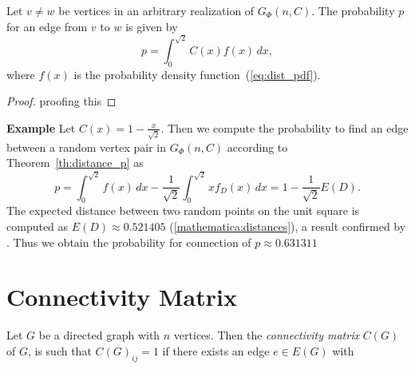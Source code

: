 \begin{theorem}\label{th:distance_p} Let $v \neq w$ be vertices in an arbitrary
  realization of $G_{\Phi}(n,C)$. The probability $p$ for an edge
  from $v$ to $w$ is given by 
  \[
    p = \int_0^{\sqrt{2}} C(x) f(x) \, dx,
  \]
  where $f(x)$ is the probability density function~(\ref{eq:dist_pdf}).
\end{theorem}
%
\begin{proof}
  proofing this
\end{proof}

\textbf{Example} Let $C(x) = 1 - \frac{x}{\sqrt{2}}$. Then we compute
the probability to find an edge between a random vertex pair in
$G_{\Phi}(n,C)$ according to Theorem~\ref{th:distance_p} as
\[
  p = \int_{0}^{\sqrt{2}} f(x) \, dx - \frac{1}{\sqrt{2}}
  \int_0^{\sqrt{2}} x f_D(x) \, dx = 1 - \frac{1}{\sqrt{2}} E(D).
\]
The expected distance between two random points on the unit square is
computed as $E(D) \approx 0.521405$ (\autoref{mathematica:distances}), a result confirmed by
\textcite{Philip2007}. Thus we obtain the probability for connection
of $p \approx 0.631311$



\section{Connectivity Matrix}

\begin{definition}
Let $G$ be a directed graph with $n$ vertices. Then the
\textit{connectivity matrix} $C(G)$ of $G$, is such that $C(G)_{ij} =
1$ if there exists an edge $e \in E(G)$ with 
\end{definition}



% 





